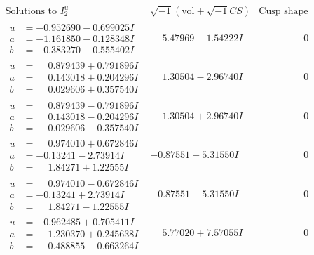 \documentclass[1p]{elsarticle_modified}
\theoremstyle{definition}
\newcommand{\I}{\sqrt{-1}}
\begin{document}
$$\begin{array}{c|c|c}
\text{Solutions to }I^u_{2}& \I (\text{vol} + \sqrt{-1}CS) & \text{Cusp shape}\\
 \hline 
\begin{aligned}
u &= -0.952690 - 0.699025 I \\
a &= -1.161850 - 0.128348 I \\
b &= -0.383270 - 0.555402 I\end{aligned}
 & \phantom{-}5.47969 - 1.54222 I & \phantom{-0.000000 } 0 \\ \hline\begin{aligned}
u &= \phantom{-}0.879439 + 0.791896 I \\
a &= \phantom{-}0.143018 + 0.204296 I \\
b &= \phantom{-}0.029606 + 0.357540 I\end{aligned}
 & \phantom{-}1.30504 - 2.96740 I & \phantom{-0.000000 } 0 \\ \hline\begin{aligned}
u &= \phantom{-}0.879439 - 0.791896 I \\
a &= \phantom{-}0.143018 - 0.204296 I \\
b &= \phantom{-}0.029606 - 0.357540 I\end{aligned}
 & \phantom{-}1.30504 + 2.96740 I & \phantom{-0.000000 } 0 \\ \hline\begin{aligned}
u &= \phantom{-}0.974010 + 0.672846 I \\
a &= -0.13241 - 2.73914 I \\
b &= \phantom{-}1.84271 + 1.22555 I\end{aligned}
 & -0.87551 - 5.31550 I & \phantom{-0.000000 } 0 \\ \hline\begin{aligned}
u &= \phantom{-}0.974010 - 0.672846 I \\
a &= -0.13241 + 2.73914 I \\
b &= \phantom{-}1.84271 - 1.22555 I\end{aligned}
 & -0.87551 + 5.31550 I & \phantom{-0.000000 } 0 \\ \hline\begin{aligned}
u &= -0.962485 + 0.705411 I \\
a &= \phantom{-}1.230370 + 0.245638 I \\
b &= \phantom{-}0.488855 - 0.663264 I\end{aligned}
 & \phantom{-}5.77020 + 7.57055 I & \phantom{-0.000000 } 0 \\ \hline\begin{aligned}

\end{aligned}
\end{array}$$
\end{document}
